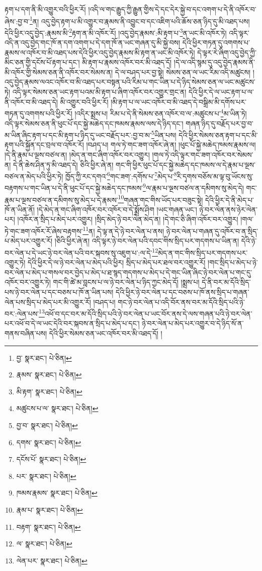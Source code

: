 རྟག་པ་དག་ནི་མི་འགྱུར་བའི་ཕྱིར་རོ། །འདི་ལ་གང་རྒྱུད་ཀྱི་རྒྱུན་གྱིས་དེ་དང་དེར་སྐྱེ་བ་དང་འགག་པ་དེ་ནི་འཁོར་བ་ཞེས་:བྱ་བ་\footnote{བྱ་  སྣར་ཐང་།  པེ་ཅིན། }ན། འདུ་བྱེད་རྟག་པ་མི་འགྱུར་བ་རྣམས་ནི་འབྱུང་བ་དང་འཇིག་པའི་ཆོས་ཅན་ཉིད་དུ་མི་འཐད་པས། དེའི་ཕྱིར་འདུ་བྱེད་:རྣམས་མི་\footnote{རྣམས་  སྣར་ཐང་།  པེ་ཅིན། }རྟག་ན་མི་འཁོར་རོ། །འདུ་བྱེད་རྣམས་:མི་རྟག་པ་\footnote{མི་རྟག་  སྣར་ཐང་།  པེ་ཅིན། }ན་ཡང་མི་འཁོར་ཏེ། འདི་ལྟར་འདི་ན་འདུ་བྱེད་གང་ཁོ་ན་དག་འགག་པ་དེ་དག་ཁོ་ན་ཡང་གཞན་དུ་མི་སྐྱེ་བས། དེའི་ཕྱིར་གཏན་དུ་འགགས་པ་རྣམས་ལ་འཁོར་བ་མི་འཐད་པས་དེའི་ཕྱིར་འདུ་བྱེད་རྣམས་མི་རྟག་ན་ཡང་མི་འཁོར་ཏེ། དེ་ལྟར་རེ་ཞིག་འདུ་བྱེད་ཀྱི་མིང་ཅན་གྱི་དངོས་པོ་རྟག་པ་དང་། མི་རྟག་པ་རྣམས་འཁོར་བར་མི་འཐད་དོ། །དེ་ལ་འདི་སྙམ་དུ་འདུ་བྱེད་རྣམས་ནི་མི་འཁོར་གྱི་སེམས་ཅན་ནི་འཁོར་བར་སེམས་ན། དེ་ལ་བཤད་པར་བྱ་སྟེ། སེམས་ཅན་ལ་ཡང་རིམ་འདི་མཚུངས། །འདུ་བྱེད་རྣམས་ལའང་འཁོར་བ་མི་འཐད་པར་བསྟན་པའི་རིམ་པ་གང་ཡིན་པ་དེ་ཉིད་སེམས་ཅན་ལ་ཡང་མཚུངས་ཏེ། འདི་ལྟར་སེམས་ཅན་ཡང་རྟག་པའམ་མི་རྟག་པ་ཞིག་འཁོར་བར་འགྱུར་གྲང་ན། དེའི་ཕྱིར་དེ་ལ་ཡང་རྟག་པ་ལ་ནི་འཁོར་བ་མི་འཐད་དེ། མི་འགྱུར་བའི་ཕྱིར་རོ། །མི་རྟག་པ་ལ་ཡང་འཁོར་བ་མི་འཐད་དེ་བསྒྲིམ་མི་དགོས་པར་གཏན་དུ་འགགས་པའི་ཕྱིར་རོ། །འདིར་སྨྲས་པ། རིམ་པ་དེ་ནི་སེམས་ཅན་འཁོར་བ་ལ་:མཚུངས་པ་\footnote{མཚུངས་པ་ལ་  སྣར་ཐང་།  པེ་ཅིན། }མ་ཡིན་ཏེ། འདི་ལྟར་སེམས་ཅན་ནི་ཕུང་པོ་དང་སྐྱེ་མཆེད་དང་ཁམས་རྣམས་ལས་དེ་ཉིད་དང་། གཞན་ཉིད་དུ་བརྗོད་པར་བྱ་བ་མ་ཡིན་ཞིང་རྟག་པ་དང་མི་རྟག་པ་ཉིད་དུ་ཡང་བརྗོད་པར་:བྱ་བ་མ་\footnote{བྱ་བ་  སྣར་ཐང་།  པེ་ཅིན། }ཡིན་པས། དེའི་ཕྱིར་སེམས་ཅན་རྟག་པ་དང་མི་རྟག་པའི་སྐྱོན་དང་བྲལ་བ་འཁོར་རོ། །བཤད་པ། གལ་ཏེ་གང་ཟག་འཁོར་ཞེ་ན། །ཕུང་པོ་སྐྱེ་མཆེད་ཁམས་རྣམས་ལ། །དེ་ནི་རྣམ་པ་ལྔས་བཙལ་ན། །མེད་ན་གང་ཞིག་འཁོར་བར་འགྱུར། །གལ་ཏེ་འདི་ལྟར་གང་ཟག་འཁོར་བར་སེམས་ན། དེ་ནི་ཆེས་ཤིན་ཏུ་མི་འཐད་དེ། ཅིའི་ཕྱིར་ཞེ་ན། གང་གི་ཕྱིར་ཕུང་པོ་དང་སྐྱེ་མཆེད་དང་ཁམས་ལ་དེ་རྣམ་པ་ལྔས་བཙལ་ན་མེད་པའི་ཕྱིར་ཏེ། ཁྱོད་ཀྱི་རང་དགའ་\footnote{དགས་  སྣར་ཐང་།  པེ་ཅིན། }གང་ཟག་:དགོས་པ་\footnote{དངོས་པོ་  སྣར་ཐང་།  པེ་ཅིན། }མེད་པ་\footnote{པར་  སྣར་ཐང་།  པེ་ཅིན། }རི་དྭགས་བཅོས་མ་ལྟ་བུ་ཡོངས་སུ་བརྟགས་པ་གང་ཡིན་པ་དེ་ནི་ཕུང་པོ་དང་སྐྱེ་མཆེད་དང་ཁམས་\footnote{ཁམས་རྣམས་  སྣར་ཐང་།  པེ་ཅིན། }ལ་རྣམ་པ་ལྔས་བཙལ་ན་དམིགས་སུ་མེད་དེ། གང་རྣམ་པ་ལྔས་བཙལ་ན་དམིགས་སུ་མེད་པ་དེ་རྣམས་\footnote{རྣམ་པ་  སྣར་ཐང་།  པེ་ཅིན། }གཞན་གང་གིས་ཡོད་པར་བཟུང་སྟེ། དེའི་ཕྱིར་དེ་ནི་མེད་པ་ཁོ་ན་ཡིན་ནོ། །དེ་མེད་ན་གང་ཞིག་འཁོར་བར་འཁོར་བ་དེ་སྨྲོས་ཤིག །ཡང་གཞན་ཡང་། ཉེ་བར་ལེན་ནས་ཉེར་ལེན་པར། །འཁོར་ན་སྲིད་པ་མེད་པར་འགྱུར། །སྲིད་མེད་ཉེ་བར་ལེན་མེད་ན། །དེ་གང་ཅི་ཞིག་འཁོར་བར་འགྱུར། །གལ་ཏེ་གང་ཟག་འཁོར་རོ་ཞེས་བརྟགས་\footnote{བརྟག་  སྣར་ཐང་།  པེ་ཅིན། }ན། དེ་ལྟ་ན་དེ་ཉེ་བར་ལེན་པ་ནས། ཉེ་བར་ལེན་པ་གཞན་དུ་འཁོར་བ་ན་སྲིད་པ་མེད་པར་འགྱུར་རོ། །ཅིའི་ཕྱིར་ཞེ་ན། འདི་ལྟར་ཉེ་བར་ལེན་པའི་དབང་གིས་སྲིད་པར་གདགས་པ་ཡིན་ན། དེའི་ཉེ་བར་ལེན་པ་དེ་ཡང་ཉེ་བར་ལེན་པའི་བར་སྐབས་སུ་འཇུག་པ་:ལ་དེ་\footnote{ལ་  སྣར་ཐང་།  པེ་ཅིན། }མེད་ན་གང་གིས་སྲིད་པར་གདགས་པར་འགྱུར་ཏེ། དེའི་ཕྱིར་དེ་ལ་ཉེ་བར་ལེན་པ་མེད་པའི་ཕྱིར། སྲིད་པ་མེད་པར་ཐལ་བར་འགྱུར་རོ། །གང་སྲིད་པ་མེད་པ་ཉེ་བར་ལེན་པ་མེད་པ་གསལ་བར་བྱེད་པ་མེད་པ་ཐ་སྙད་གདགས་པ་མེད་པ་དེ་གང་ཡིན་ཞིང་ཉེ་བར་ལེན་པ་གང་དུ་འཁོར་བར་འགྱུར་ཏེ། གང་གི་ཚེ་མ་བླངས་པ་ལ་ཉེ་བར་ལེན་པ་ཉིད་ཀྱང་མེད་དོ། །སྨྲས་པ། དེ་ནི་བར་མ་དོའི་སྲིད་པས་ཉེ་བར་ལེན་པ་དང་བཅས་པ་ཁོ་ན་ཡིན་པས། དེའི་ཕྱིར་ཉེ་བར་ལེན་པ་དང་བཅས་པ་ཁོ་ནས་སྲིད་པ་གཞན་ལེན་པས་སྲིད་པ་མེད་པར་མི་འགྱུར་རོ། །བཤད་པ། གང་ཉེ་བར་ལེན་པ་འདི་བོར་ནས་བར་མ་དོའི་སྲིད་པའི་ཉེ་བར་:ལེན་པས་\footnote{ལེན་པར་  སྣར་ཐང་།  པེ་ཅིན། }འཕོ་བ་དང་བར་མ་དོའི་སྲིད་པའི་ཉེ་བར་ལེན་པ་ཡང་བོར་ནས་དེ་ལས་གཞན་པའི་ཉེ་བར་ལེན་པར་འཕོ་བ་དེ་ལ་ཡང་དེའི་བར་སྐབས་ན་སྲིད་པ་མེད་པ་དང་། ཉེ་བར་ལེན་པ་མེད་པར་འགྱུར་བ་དེ་ཉིད་སོ་ན་གནས་བཞིན་པས། དེའི་ཕྱིར་སེམས་ཅན་ཡང་འཁོར་བར་མི་འཐད་དོ། །
